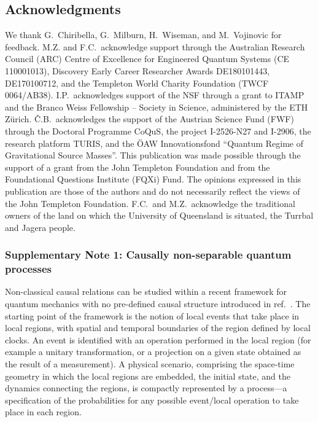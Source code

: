 \documentclass[a4paper,11pt]{article}
\begin{document}
\subsection*{Acknowledgments}
We thank G.~Chiribella,  G.~Milburn, H.~Wiseman, and M.~Vojinovic for feedback. M.Z. and F.C.\ acknowledge support through the Australian Research Council (ARC) Centre of Excellence for  Engineered Quantum Systems (CE 110001013), Discovery Early Career Researcher Awards DE180101443, DE170100712, and the Templeton World Charity Foundation (TWCF 0064/AB38). I.P.\ acknowledges support of the NSF through a grant to ITAMP and the Branco Weiss Fellowship -- Society in Science, administered by the ETH Z\"{u}rich. {\v C}.B.\ acknowledges the support of the Austrian Science Fund (FWF) through the Doctoral Programme CoQuS, the project I-2526-N27 and I-2906, the research platform TURIS, and the \"{O}AW Innovationsfond ``Quantum Regime of Gravitational Source Masses''. This publication  was made possible through the support of a grant from the John Templeton Foundation and from the Foundational Questions Institute (FQXi) Fund. The opinions expressed in this publication are those of the authors and do not necessarily reflect the views of the John Templeton Foundation. F.C.~and M.Z.~acknowledge the traditional owners of the land on which the University of Queensland is situated, the Turrbal and Jagera people.\\

\subsubsection*{Supplementary Note 1: Causally non-separable quantum processes}

Non-classical causal relations can be studied within a recent framework for quantum mechanics with no pre-defined causal structure introduced in ref.~\cite{Oreshkov:2012}.
The starting point of the framework is the notion of {local events} that take place in {local regions}, {with spatial and temporal boundaries of the region defined by local clocks}.
An event is identified with an operation performed in the local region (for example a unitary transformation, or a projection on a given state obtained as the result of a measurement).
A physical scenario, comprising the space-time geometry in which the local regions are embedded, the initial state, and the dynamics connecting the regions, is compactly represented by a {process}---a specification of the probabilities for any possible event/local operation to take place in each region.
\end{document}
